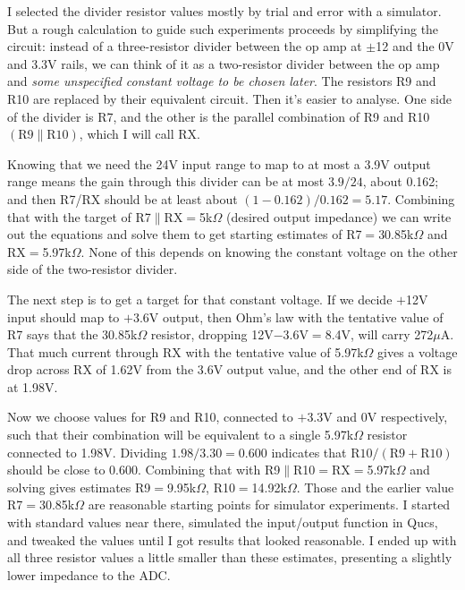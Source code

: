 I selected the divider resistor values mostly by trial and error with a
simulator.  But a rough calculation to guide such experiments proceeds by
simplifying the circuit:  instead of a three-resistor divider between the op
amp at $\pm$12 and the 0V and 3.3V rails, we can think of it as a
two-resistor divider between the op amp and \emph{some unspecified constant
voltage to be chosen later}.  The resistors R9 and R10 are replaced by their
equivalent circuit.  Then it's easier to analyse.  One side of the
divider is R7, and the other is the parallel combination of R9 and R10
$(\textrm{R}9\|\textrm{R}10)$, which I will call RX.

Knowing that we need the 24V input range to map to at most a 3.9V output
range means the gain through this divider can be at most $3.9/24$, about
0.162; and then R7/RX should be at least about $(1-0.162)/0.162=5.17$. 
Combining that with the target of R7$\|$RX$=$5k$\Omega$ (desired output
impedance) we can write out the equations and solve them to get starting
estimates of R7$=$30.85k$\Omega$ and RX$=$5.97k$\Omega$.  None of this
depends on knowing the constant voltage on the other side of the
two-resistor divider.

The next step is to get a target for that constant voltage.  If we decide
$+$12V input should map to $+$3.6V output, then Ohm's law with the tentative
value of R7 says that the 30.85k$\Omega$ resistor, dropping
12V$-$3.6V$=$8.4V, will carry 272$\mu$A.  That much current through RX with
the tentative value of 5.97k$\Omega$ gives a voltage drop across RX of 1.62V
from the 3.6V output value, and the other end of RX is at 1.98V.

Now we choose values for R9 and R10, connected to $+$3.3V and 0V
respectively, such that their combination will be equivalent to a single
5.97k$\Omega$ resistor connected to 1.98V.  Dividing $1.98/3.30=0.600$
indicates that $\textrm{R}10/(\textrm{R}9+\textrm{R}10)$ should be close to
0.600.  Combining that with R9$\|$R10$=$RX$=$5.97k$\Omega$ and solving gives
estimates R9$=$9.95k$\Omega$, R10$=$14.92k$\Omega$.  Those and the earlier
value R7$=$30.85k$\Omega$ are reasonable starting points for simulator
experiments.  I started with standard values near there, simulated the
input/output function in Qucs, and tweaked the values until I got results
that looked reasonable.  I ended up with all three resistor values a little
smaller than these estimates, presenting a slightly lower impedance to the
ADC.

